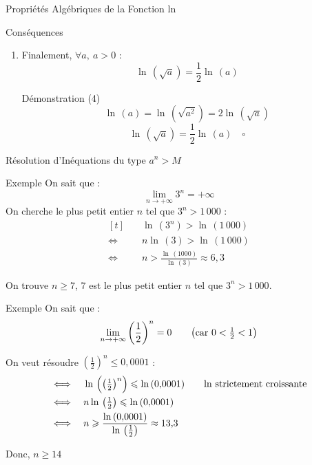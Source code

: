 \documentclass{coursbook}
\begin{document}
\begin{Gpartie}{Propriétés Algébriques de la Fonction ln}
\begin{Spartie}{Conséquences}
\begin{enumerate}[(1)]
\begin{SSpartie}{Démonstration (3)}
                \end{SSpartie}
                \item Finalement, $\forall a,~a>0$ :
                \[\ln\,\left(\sqrt{a}\right)=\frac{1}{2}\ln\,(a)\]
                \begin{SSpartie}{Démonstration (4)}
                    \[\ln\,(a)=\ln\,\left(\sqrt{a^2}\right)=2\ln\,\left(\sqrt{a}\right)\]
                    \[\ln\,\left(\sqrt{a}\right)=\frac{1}{2}\ln\,(a)\quad\square\]

                \end{SSpartie}
            \end{enumerate}
        \end{Spartie}
    \end{Gpartie}
    \pagebreak
    \begin{Gpartie}{Résolution d'Inéquations du type $a^n>M$}
        \begin{Spartie}{Exemple}
            On sait que : \[\lim_{n\to+\infty}3^n=+\infty\]
            On cherche le plus petit entier $n$ tel que $3^n>1\,000$ :
            \[\begin{aligned}[t]
                &\quad\ln\,\left(3^n\right)>\ln\,(1\,000) \\
                \iff&\quad n\ln\,(3)>\ln\,(1\,000) \\
                \iff&\quad n>\frac{\ln\,(1000)}{\ln\,(3)}\approx 6{,}3
            \end{aligned}\]

            On trouve $n\geq 7$, $7$ est le plus petit entier $n$ tel que $3^n>1\,000$.
        \end{Spartie}
        \begin{Spartie}{Exemple}
            On sait que : \[\lim_{n\to+\infty}\left(\frac{1}{2}\right)^n=0\text{\qquad \big(car $0<\tfrac{1}{2}<1$\big)}\]
            
            On veut résoudre $\left(\frac{1}{2}\right)^n\leq 0{,}0001$ :
            \[\begin{aligned}[t]
                \iff&\quad\ln\,\Big(\big(\tfrac{1}{2}\big)^n\Big)\leq\ln\,(0{,}0001)\text{\qquad $\ln$ strictement croissante} \\
                \iff&\quad n\ln\,\big(\tfrac{1}{2}\big)\leq\ln\,(0{,}0001) \\
                \iff&\quad n\geq\frac{\ln\,(0{,}0001)}{\ln\,\left(\frac{1}{2}\right)}\approx13{,}3
            \end{aligned}\]

            Donc, $n\geq 14$
        \end{Spartie}
    \end{Gpartie}
\end{document}
